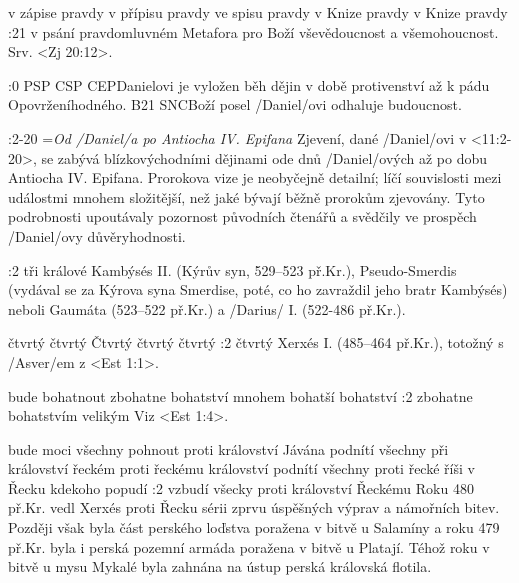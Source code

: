     {v zápise pravdy}   %
    {v přípisu pravdy}   %
    {ve spisu pravdy}   %
    {v Knize pravdy}   %
    {v Knize pravdy}   %
:21 {v psání pravdomluvném}
Metafora pro Boží vševědoucnost a všemohoucnost. Srv. <Zj 20:12>.

:0 {} 
% 
        {PSP}{}%
        {CSP}{}%
        {CEP}{Danielovi je vyložen běh dějin v době protivenství až k pádu Opovrženíhodného.}%
        {B21}{}%
        {SNC}{Boží posel \x/Daniel/ovi odhaluje budoucnost.}%

              


:2-20 {}={\em Od \x/Daniel/a po Antiocha IV. Epifana} 
    Zjevení, dané \x/Daniel/ovi v <11:2-20>, se zabývá blízkovýchodními dějinami ode dnů \x/Daniel/ových až po dobu Antiocha IV. Epifana. Prorokova vize je neobyčejně detailní; líčí  souvislosti mezi událostmi mnohem složitější, než jaké bývají běžně prorokům zjevovány. Tyto podrobnosti upoutávaly pozornost původních čtenářů a svědčily ve prospěch \x/Daniel/ovy důvěryhodnosti.

:2 {tři králové} Kambýsés II. (Kýrův syn, 529--523 př.Kr.), Pseudo-Smerdis (vydával se za Kýrova syna Smerdise, poté, co ho zavraždil jeho bratr Kambýsés) neboli Gaumáta (523--522 př.Kr.) a \x/Darius/ I. (522-486 př.Kr.).

    {čtvrtý} %
    {čtvrtý}  %
    {Čtvrtý} %
    {čtvrtý}  %
    {čtvrtý}  %
:2 {čtvrtý} Xerxés I. (485--464 př.Kr.), totožný s \x/Asver/em z <Est 1:1>.

    {bude bohatnout}   %
    {zbohatne}   %
    {bohatství}   %
    {mnohem bohatší}   %
    {bohatství}   %
:2 {zbohatne bohatstvím velikým} Viz <Est 1:4>.

    {bude moci všechny pohnout proti království Jávána}   %
    {podnítí všechny při království řeckém}   %
    {proti řeckému království}   %
    {podnítí všechny proti řecké říši}   %
    {v Řecku kdekoho popudí}   %
:2 {vzbudí všecky proti království Řeckému} Roku 480 př.Kr. vedl Xerxés proti Řecku sérii zprvu úspěšných výprav a námořních bitev. Později však byla část perského loďstva poražena v bitvě u Salamíny a roku 479 př.Kr. byla i perská pozemní armáda poražena v bitvě u Platají. Téhož roku  v bitvě u mysu Mykalé byla zahnána na ústup perská královská flotila.

